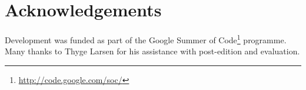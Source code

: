 \documentclass[11pt]{article}
\begin{document}

\section*{Acknowledgements}

Development was funded as part of the Google Summer of Code\footnote{\url{http://code.google.com/soc/}} 
programme. Many thanks to Thyge Larsen for his assistance with post-edition and evaluation.



\end{document}

